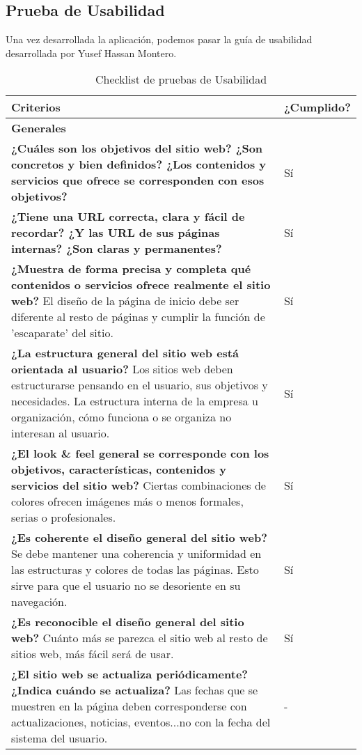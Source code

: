 \subsection{Prueba de Usabilidad}
Una vez desarrollada la aplicación, podemos pasar la guía de usabilidad desarrollada por Yusef Hassan Montero\cite{Usabilidad}.
\begin{longtable}[H]{p{31em}|p{5em}}
\caption{Checklist de pruebas de Usabilidad}
\\ \hline
\cellcolor[rgb]{.949,  .949,  .949} \textbf{Criterios} & \cellcolor[rgb]{.949,  .949,  .949}\textbf{¿Cumplido?} \\ \hline
\multicolumn{2}{p{36em}}{\cellcolor[rgb]{ .851,  .886,  .953} \textbf{Generales}} \\ \hline
\textbf{¿Cuáles son los objetivos del sitio web? ¿Son concretos y bien definidos? ¿Los contenidos y servicios que ofrece se corresponden con esos objetivos?} & Sí \\ \hline
\textbf{¿Tiene una URL correcta, clara y fácil de recordar? ¿Y las URL de sus páginas internas? ¿Son claras y permanentes?} & Sí \\ \hline
\textbf{¿Muestra de forma precisa y completa qué contenidos o servicios ofrece realmente el sitio web?} El diseño de la página de inicio debe ser diferente al resto de páginas y cumplir la función de 'escaparate' del sitio. & Sí \\ \hline
\textbf{¿La estructura general del sitio web está orientada al usuario?} Los sitios web deben estructurarse pensando en el usuario, sus objetivos y necesidades. La estructura interna de la empresa u organización, cómo funciona o se organiza no interesan al usuario. & Sí \\ \hline
\textbf{¿El look \& feel general se corresponde con los objetivos, características, contenidos y servicios del sitio web?} Ciertas combinaciones de colores ofrecen imágenes más o menos formales, serias o profesionales. & Sí \\ \hline
\textbf{¿Es coherente el diseño general del sitio web?} Se debe mantener una coherencia y uniformidad en las estructuras y colores de todas las páginas. Esto sirve para que el usuario no se desoriente en su navegación. & Sí \\ \hline
\textbf{¿Es reconocible el diseño general del sitio web?} Cuánto más se parezca el sitio web al resto de sitios web, más fácil será de usar. & Sí \\ \hline
\textbf{¿El sitio web se actualiza periódicamente? ¿Indica cuándo se actualiza?} Las fechas que se muestren en la página deben corresponderse con actualizaciones, noticias, eventos...no con la fecha del sistema del usuario. & - \\ \hline

\end{longtable}
